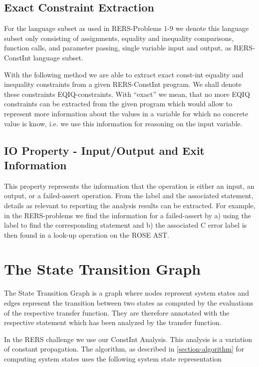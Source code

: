 \subsection{Exact Constraint Extraction}

For the language subset as used in RERS-Problems 1-9 we denote this
language subset only consisting of assignments, equality and
inequality comparisons, function calls, and parameter passing, single
variable input and output, as RERS-ConstInt language subset.

With the following method we are able to extract exact const-int
equality and inequality constraints from a given RERS-ConstInt
program. We shall denote these constraints EQIQ-constraints. With
``exact'' we mean, that no more EQIQ constraints can be extracted from
the given program which would allow to represent more information
about the values in a variable for which no concrete value is know,
i.e. we use this information for reasoning on the input variable.


\subsection{IO Property - Input/Output and Exit Information}

This property represents the information that the operation is either
an input, an output, or a failed-assert operation. From the label and
the associated statement, details as relevant to reporting the
analysis results can be extracted. For example, in the RERS-problems
we find the information for a failed-assert by a) using the label to
find the corresponding statement and b) the associated C error label
is then found in a look-up operation on the ROSE AST.

\section{The State Transition Graph}

\newcommand{\deqop}[0]{\#\#}
\newcommand{\eq}[0]{=}

The State Transition Graph is a graph where nodes represent system states
and edges represent the transition between two states as computed by
the evaluations of the respective transfer function. They are
therefore annotated with the respective statement which has been
analyzed by the transfer function.

In the RERS challenge we use our ConstInt Analysis. This analysis is a
variation of constant propagation. The algorithm, as described in
\ref{section-algorithm} for computing system states uses the
following system state representation

